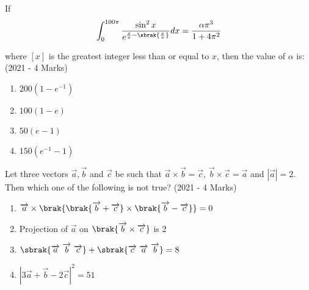  	\item{
			If  $$\int_0^{100\pi} \frac{\sin^2 x}{e^{\frac{x}{\pi} - \sbrak{\frac{x}{\pi}}}} dx = \frac{\alpha \pi^3}{1+ 4\pi^2}$$
			
			where $[x]$ is the greatest integer less than or equal to $x$, then the value of $\alpha$ is:
			\\ \text{ }
			\hfill
			{(2021 - 4 Marks)}
			
			\begin{multicols}{4}
				\begin{enumerate}
					\item $200(1 - e ^{-1})$
					\item $100(1 - e)$
					\item $50(e - 1)$
					\item $150(e^{-1} - 1)$
				\end{enumerate}
			\end{multicols}
			
		}
 	\item{
			Let three vectors $\overrightarrow{a},\overrightarrow{b}$ and $\overrightarrow{c}$ be such that $\overrightarrow{a} \times \overrightarrow{b} = \overrightarrow{c}$, $\overrightarrow{b} \times \overrightarrow{c} =\overrightarrow{a}$ and $|\overrightarrow{a}| = 2$. Then which one of the following is not true?\text{ }
			\hfill
			{(2021 - 4 Marks)}
			
			\begin{multicols}{2}
				\begin{enumerate}
					\item $\overrightarrow{a}\times\brak{\brak{\overrightarrow{b}+\overrightarrow{c}}\times\brak{\overrightarrow{b}-\overrightarrow{c}}} = 0$
					\item Projection of $\overrightarrow{a}$ on $\brak{\overrightarrow{b}\times\overrightarrow{c}}$ is 2
					\item $\sbrak{\overrightarrow{a}\text{ }\overrightarrow{b}\text{ }\overrightarrow{c}}+\sbrak{\overrightarrow{c}\text{ }\overrightarrow{a}\text{ }\overrightarrow{b}} =8$
					\item $|3\overrightarrow{a}+\overrightarrow{b}  -2\overrightarrow{c}|^2 = 51$
				\end{enumerate}
			\end{multicols}
			
		}
